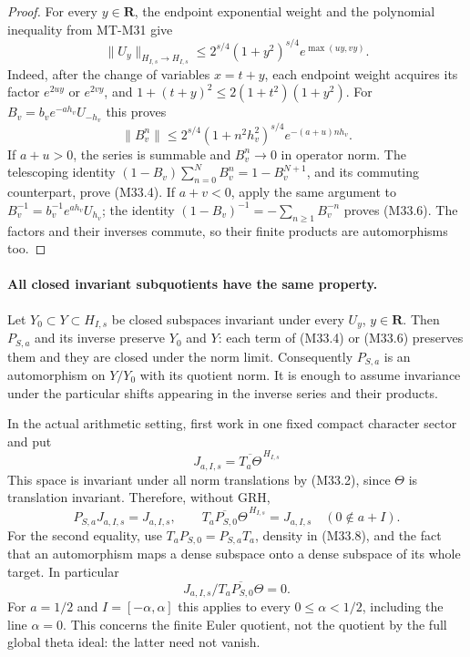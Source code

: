 \begin{proof}
For every $y\in\mathbf R$, the endpoint exponential
weight and the polynomial inequality from MT-M31 give
\[
 \|U_y\|_{H_{I,s}\to H_{I,s}}
 \leq2^{s/4}(1+y^2)^{s/4}
                      e^{\max(uy,vy)}.
 \tag{M33.7}
\]
Indeed, after the change of variables $x=t+y$, each
endpoint weight acquires its factor $e^{2uy}$ or
$e^{2vy}$, and
$1+(t+y)^2\leq2(1+t^2)(1+y^2)$.
For $B_v=b_ve^{-ah_v}U_{-h_v}$ this proves
\[
 \|B_v^n\|\leq2^{s/4}(1+n^2h_v^2)^{s/4}
                                      e^{-(a+u)nh_v}.
\]
If $a+u>0$, the series is summable and $B_v^n\to0$
in operator norm.  The telescoping identity
$(1-B_v)\sum_{n=0}^{N}B_v^n=1-B_v^{N+1}$,
and its commuting counterpart, prove (M33.4).
If $a+v<0$, apply the same argument to
$B_v^{-1}=b_v^{-1}e^{ah_v}U_{h_v}$; the identity
$(1-B_v)^{-1}=-\sum_{n\geq1}B_v^{-n}$ proves
(M33.6).  The factors and their inverses commute,
so their finite products are automorphisms too.
\end{proof}

\paragraph{All closed invariant subquotients have the same property.}
Let $Y_0\subset Y\subset H_{I,s}$ be closed subspaces
invariant under every $U_y$, $y\in\mathbf R$.
Then $P_{S,a}$ and its inverse preserve $Y_0$ and $Y$:
each term of (M33.4) or (M33.6) preserves them and
they are closed under the norm limit.
Consequently $P_{S,a}$ is an automorphism on $Y/Y_0$
with its quotient norm.  It is enough to assume
invariance under the particular shifts appearing in
the inverse series and their products.

In the actual arithmetic setting,
first work in one fixed compact character sector and put
\[
          J_{a,I,s}=\overline{T_a\Theta}^{\,H_{I,s}}
 \tag{M33.8}
\]
This space is invariant under all norm translations by (M33.2),
since $\Theta$ is translation invariant.
Therefore, without GRH,
\[
 P_{S,a}J_{a,I,s}=J_{a,I,s},\qquad
 \overline{T_aP_{S,0}\Theta}^{\,H_{I,s}}=J_{a,I,s}
                   \quad(0\notin a+I).
 \tag{M33.9}
\]
For the second equality, use
$T_aP_{S,0}=P_{S,a}T_a$, density in (M33.8), and
the fact that an automorphism maps a dense subspace
onto a dense subspace of its whole target.
In particular
\[
       J_{a,I,s}/\overline{T_aP_{S,0}\Theta}=0.
 \tag{M33.10}
\]
For $a=1/2$ and $I=[-\alpha,\alpha]$ this applies
to every $0\leq\alpha<1/2$, including the line
$\alpha=0$.  This concerns the finite Euler quotient,
not the quotient by the full global theta ideal:
the latter need not vanish.

